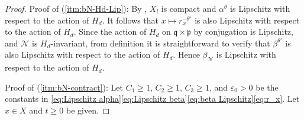 \documentclass[12pt,reqno]{amsart}
\numberwithin{equation}{section}
\theoremstyle{plain}
\theoremstyle{definition}
\theoremstyle{remark}
\newcommand\cN{\mathcal{N}}
\newcommand\fp{\mathfrak{p}}
\newcommand\fq{\mathfrak{q}}
\newcommand{\eps}{\varepsilon}
\newcommand{\bN}{\beta_\cN}
\begin{document}
\begin{proof}
        Proof of (\ref{itm:bN-Hd-Lip}): By \cite[Lemma 4.1]{Shi20}, $X_l$ is compact and $\alpha^{\theta}$ is Lipschitz with respect to the action of $H_d$. It follows that $x\mapsto r_x^{-\theta'}$ is also Lipschitz with respect to the action of $H_d$. Since the action of $H_d$ on $\fq\times \fp$ by conjugation is Lipschitz, and $\cN$ is $H_d$-invariant, from definition it is straightforward to verify that $\beta^{\theta'}$ is also Lipschitz with respect to the action of $H_d$. Hence $\bN$ is Lipschitz with respect to the action of $H_d$.

    
    
        Proof of (\ref{itm:bN-contract}): Let $C_1\geq 1$, $C_2\geq 1$, $C_3\geq 1$, and $\eps_0>0$ be the constants in \eqref{eq:Lipschitz alpha}\eqref{eq:Lipschitz beta}\eqref{eq:beta Lipschitz}\eqref{eq:r_x}. Let $x\in X$ and $t\geq0$ be given.


\end{proof}
\end{document}
